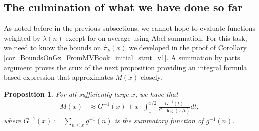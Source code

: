 \documentclass[11pt,reqno,a4letter]{article}
\numberwithin{figure}{section}
\numberwithin{table}{section}
\theoremstyle{plain}
\newtheorem{prop}[theorem]{Proposition}
\numberwithin{theorem}{section}
\theoremstyle{definition}
\begin{document}
\subsection{The culmination of what we have done so far} 

As noted before in the previous subsections, we cannot hope to evaluate
functions weighted by $\lambda(n)$ except for on 
average using Abel summation. For this task, 
we need to know the bounds on $\widehat{\pi}_k(x)$ we developed in the 
proof of Corollary \ref{cor_BoundsOnGz_FromMVBook_initial_stmt_v1}. 
A summation by parts argument proves the crux of the next proposition providing an 
integral formula based expression that approximates $M(x)$ closely. 

\begin{prop}
\label{prop_Mx_SBP_IntegralFormula} 
For all sufficiently large $x$, we have that 
\begin{align} 
\label{eqn_pf_tag_v2-restated_v2} 
M(x) & \approx G^{-1}(x) + x \cdot \int_1^{x/2} \frac{G^{-1}(t)}{t^2 \cdot \log(x/t)} dt, 
\end{align} 
where $G^{-1}(x) := \sum_{n \leq x} g^{-1}(n)$ is the summatory function of $g^{-1}(n)$. 
\end{prop} 
\end{document}
